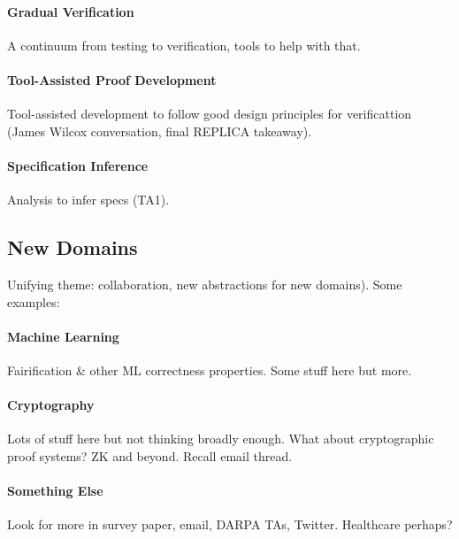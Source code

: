 \paragraph{Gradual Verification} A continuum from testing to verification, tools to help with that.

\paragraph{Tool-Assisted Proof Development} Tool-assisted development to follow good design principles for verificattion (James Wilcox conversation, final REPLICA takeaway).

\paragraph{Specification Inference} Analysis to infer specs (TA1).

\subsection*{New Domains}

Unifying theme: collaboration, new abstractions for new domains). Some examples:

\paragraph{Machine Learning} Fairification \& other ML correctness properties. Some stuff here but more.

\paragraph{Cryptography} Lots of stuff here but not thinking broadly enough. What about cryptographic proof systems? ZK and beyond. Recall email thread.

\paragraph{Something Else} Look for more in survey paper, email, DARPA TAs, Twitter. Healthcare perhaps? %
